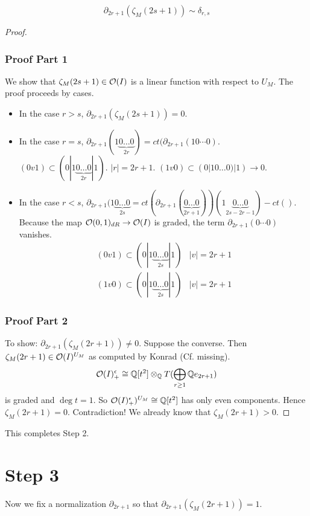 \begin{prop}
\[
\partial_{2r+1}(\zeta_M(2s+1)) \sim \delta_{r,s}
\]
\end{prop}
\begin{proof}
\subsubsection{Proof Part 1}
We show that $\zeta_M(2s+1) \in \mathcal{O}(I)$ is a linear function with respect to $U_M$. The proof proceeds by cases.
\begin{itemize}
\item[] In the case $r > s$, $\partial_{2r+1}(\zeta_M(2s+1)) = 0$. 
\item[] In the case $r=s$, $\partial_{2r+1}(1 \underbrace{0 \ldots 0}_{2r}) = ct(\partial_{2r+1}(10\cdots0)$. $(0v1) \subset (0|1\underbrace{0 \ldots 0}_{2r}|1)$. $|r| = 2r+1$. $(1v0) \subset (0|10\ldots0)|1) \to 0$.
\item[] In the case $r < s$, $\partial_{2r+1}(1\underbrace{0\ldots0}_{2s} = ct(\partial_{2r+1}(\underbrace{0\ldots0}_{2r+1}))(1\underbrace{0 \ldots 0}_{2s-2r-1}) - ct()$. Because the map $\mathcal{O}(0,1)_{dR} \to \mathcal{O}(I)$ is graded, the term $\partial_{2r+1}(0 \cdots 0)$ vanishes.
\begin{eqnarray*}
(0v1) \subset (0|1\underbrace{0\ldots0}_{2s}|1) & |v|=2r+1 \\
(1v0) \subset (0|1\underbrace{0\ldots0}_{2s}|1) & |v|=2r+1
\end{eqnarray*}
\end{itemize}

\subsubsection{Proof Part 2}
To show: $\partial_{2r+1}(\zeta_M(2r+1)) \neq 0$. Suppose the converse. Then $\zeta_M(2r+1) \in \mathcal{O}(I)^{U_M}$ as computed by Konrad (Cf. missing).
\[\label{eq:explicitdesc}
\mathcal{O}(I)^{\epsilon}_+ \cong \mathbb{Q}[t^2] \otimes_{\mathbb{Q}} T(\bigoplus_{r \geq 1} \mathbb{Q} e_{2r+1})
\]
is graded and $\deg t = 1$. So $\mathcal{O}(I)^{\epsilon}_+)^{U_M} \cong \mathbb{Q}[t^2]$ has only even components. Hence $\zeta_M(2r+1)=0$. Contradiction! We already know that $\zeta_M(2r+1) > 0$.
\end{proof}

This completes Step 2.

\section{Step 3}
\begin{rem}
Now we fix a normalization $\partial_{2r+1}$ so that $\partial_{2r+1}(\zeta_M(2r+1)) = 1$.
\end{rem}

